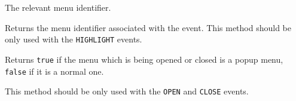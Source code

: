 The relevant menu identifier.

\label{wxmenueventgetmenuid}


Returns the menu identifier associated with the event. This method should be
only used with the {\tt HIGHLIGHT} events.

\label{wxmenueventispopup}


Returns {\tt true} if the menu which is being opened or closed is a popup menu, 
{\tt false} if it is a normal one.

This method should be only used with the {\tt OPEN} and {\tt CLOSE} events.


